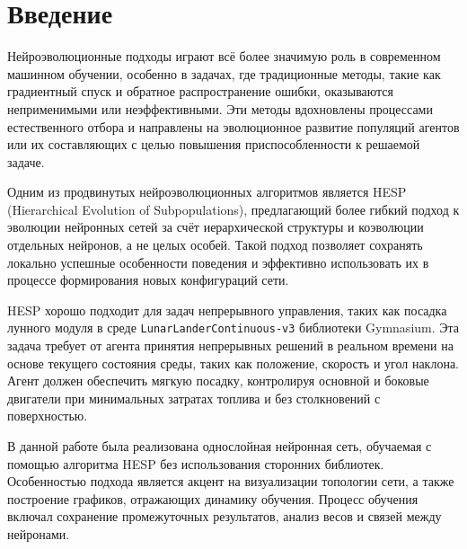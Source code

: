 \documentclass[a4paper,12pt]{article}
\begin{document}
\titleformat{\section}{\normalfont\bfseries}{\thesection}{1em}{}
\titleformat{\subsection}{\normalfont\bfseries}{\thesubsection}{1em}{}
\setlength{\parindent}{15mm}
\onehalfspacing

\section{Введение}

Нейроэволюционные подходы играют всё более значимую роль в современном машинном обучении, особенно в задачах, где традиционные методы, такие как градиентный спуск и обратное распространение ошибки, оказываются неприменимыми или неэффективными. Эти методы вдохновлены процессами естественного отбора и направлены на эволюционное развитие популяций агентов или их составляющих с целью повышения приспособленности к решаемой задаче. 

Одним из продвинутых нейроэволюционных алгоритмов является HESP (Hierarchical Evolution of Subpopulations), предлагающий более гибкий подход к эволюции нейронных сетей за счёт иерархической структуры и коэволюции отдельных нейронов, а не целых особей. 
Такой подход позволяет сохранять локально успешные особенности поведения и эффективно использовать их в процессе формирования новых конфигураций сети.

HESP хорошо подходит для задач непрерывного управления, таких как посадка лунного модуля в среде \texttt{LunarLanderContinuous-v3} библиотеки Gymnasium. Эта задача требует от агента принятия непрерывных решений в реальном времени на основе текущего состояния среды, таких как положение, скорость и угол наклона. Агент должен обеспечить мягкую посадку, контролируя основной и боковые двигатели при минимальных затратах топлива и без столкновений с поверхностью.

В данной работе была реализована однослойная нейронная сеть, обучаемая с помощью алгоритма HESP без использования сторонних библиотек. Особенностью подхода является акцент на визуализации топологии сети, а также построение графиков, отражающих динамику обучения. Процесс обучения включал сохранение промежуточных результатов, анализ весов и связей между нейронами.
\end{document}
